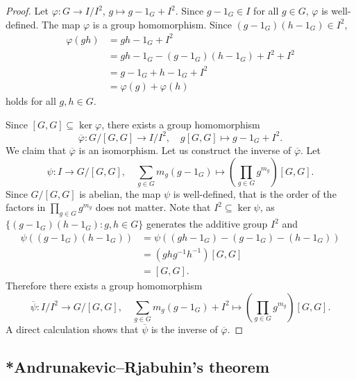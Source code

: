 \begin{proof}
    Let $\varphi\colon G\to I/I^2$, $g\mapsto g-1_G+I^2$. Since $g-1_G\in I$ for all $g\in G$, $\varphi$ is well-defined. The map $\varphi$ is a group homomorphism. Since 
    $(g-1_G)(h-1_G)\in I^2$, 
    \begin{align*}
    \varphi(gh) &= gh-1_G+I^2\\
    &=gh-1_G-(g-1_G)(h-1_G)+I^2+I^2\\
    &=g-1_G+h-1_G+I^2\\
    &=\varphi(g)+\varphi(h)
    \end{align*}
    holds for all $g,h\in G$. 

    Since $[G,G]\subseteq\ker\varphi$, there exists a group homomorphism
    \[
    \overline{\varphi}\colon G/[G,G]\to I/I^2,\quad 
    g[G,G]\mapsto g-1_G+I^2.
    \]
    We claim that $\overline{\varphi}$ is an isomorphism. 
    Let us construct the inverse of $\overline{\varphi}$. Let 
    \[
    \psi\colon I\to G/[G,G],\quad 
    \sum_{g\in G}m_g(g-1_G)\mapsto \left(\prod_{g\in G}g^{m_g}\right)[G,G].
    \]
    Since $G/[G,G]$ is abelian, the map $\psi$ is well-defined, that is
    the order of the factors in $\prod_{g\in G}g^{m_g}$ does not matter. Note that 
    $I^2\subseteq\ker\psi$, as 
    $\{(g-1_G)(h-1_G):g,h\in G\}$ generates the additive group $I^2$ 
    and 
    \begin{align*}
        \psi((g-1_G)(h-1_G))&=\psi( (gh-1_G)-(g-1_G)-(h-1_G))\\
        &=(ghg^{-1}h^{-1})[G,G]\\
        &=[G,G].
    \end{align*}
    Therefore there exists a group homomorphism
    \[
    \overline{\psi}\colon I/I^2\to G/[G,G],\quad 
    \sum_{g\in G}m_g(g-1_G)+I^2\mapsto \left(\prod_{g\in G}g^{m_g}\right)[G,G].
    \]
    A direct calculation shows that $\overline{\psi}$ is the inverse 
    of $\overline{\varphi}$. 
\end{proof}

\subsection{*Andrunakevic--Rjabuhin's theorem}

